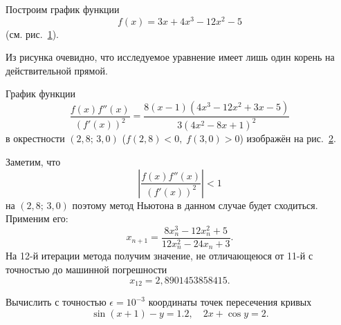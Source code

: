 \documentclass[a4paper]{article}
\begin{document}
\begin{sol}
Построим график функции
\[
	f(x)=3x+4x^3-12x^2-5
\] 
(см. рис.~\ref{fig:2}).
\begin{figure}[]
	\centering
	\caption{}
	\label{fig:2}
\end{figure}
Из рисунка очевидно, что исследуемое уравнение имеет лишь один
корень на действительной прямой.

График функции
\[
	 \frac{f(x) f''(x)}{(f'(x))^2}=
\frac{8 (x-1) \left(4 x^3-12 x^2+3 x-5\right)}{3 \left(4 x^2-8 x+1\right)^2}
\]
в окрестности $(2,8;\,3,0)$ ($f(2,8)<0,\; f(3,0)>0$) изображён
на рис.~\ref{fig:3}.
\begin{figure}[]
	\centering
	\caption{}
	\label{fig:3}
\end{figure}
Заметим, что
\[
	\left| \frac{f(x)f''(x)}{(f'(x))^2} \right| <1
\]
на $(2,8;\,3,0)$ поэтому метод Ньютона в данном случае будет
сходиться. Применим его:
\[
x_{n+1}=\frac{8 x_n^3-12 x_n^2+5}{12 x_n^2-24 x_n+3} 
.\] 
На 12-й итерации метода получим значение, не отличающеюся от
11-й с точностью до машинной погрешности
\[
x_{12}=2,8901453858415
.\] 
\end{sol}
\begin{hiProb}[12.5а]
Вычислить с точностью $\epsilon=10^{-3}$ координаты точек пересечения кривых
\[
	\sin(x+1)-y=1.2,\quad 2x+\cos y=2
.\] 
\end{hiProb}
\end{document}
